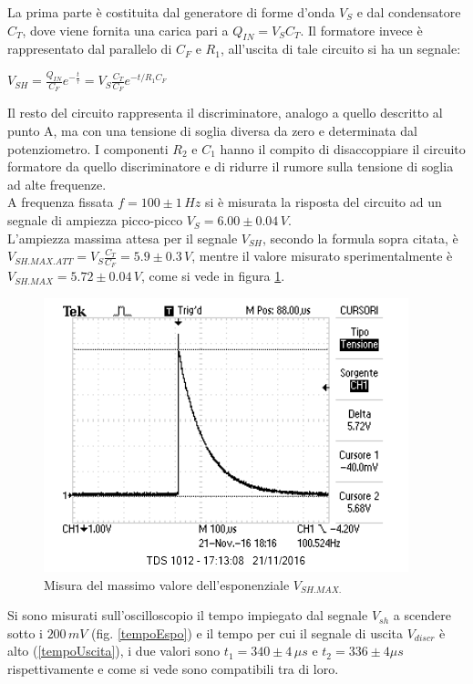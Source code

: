 \documentclass[10pt,a4paper]{article}
\begin{document}
La prima parte è costituita dal generatore di forme d'onda $V_S$ e dal condensatore $C_T$, dove viene fornita una carica pari a $Q_{IN}=V_S C_T$. Il formatore invece è rappresentato dal parallelo di $C_F$ e $R_1$, all'uscita di tale circuito si ha un segnale:\\
\begin{center}
$V_{SH}=\frac{Q_{IN}}{C_F} e^{-\frac{t}{\tau}} = V_S \frac{C_T}{C_F} e^{-t/R_1 C_F}$\\
\end{center}

Il resto del circuito rappresenta il discriminatore, analogo a quello descritto al punto A, ma con una tensione di soglia diversa da zero e determinata dal potenziometro. I componenti $R_2$ e $C_1$ hanno il compito di disaccoppiare il circuito formatore da quello discriminatore e di ridurre il rumore sulla tensione di soglia ad alte frequenze.\\
A frequenza fissata $f = 100\pm 1 \, Hz$ si è misurata la risposta del circuito ad un segnale di ampiezza picco-picco $V_S = 6.00 \pm 0.04 \, V$.\\
L'ampiezza massima attesa per il segnale $V_{SH}$, secondo la formula sopra citata, è $V_{SH.MAX.ATT} = V_S \frac{C_T}{C_F} =  5.9 \pm 0.3 \, V$, mentre il valore misurato sperimentalmente è $V_{SH.MAX} = 5.72 \pm 0.04 \, V$, come si vede in figura \ref{esponenziale}.\\

\begin{figure}[htb!]
\centering
\includegraphics[scale=1.0]{immagini/esponenziale.png}
\caption{Misura del massimo valore dell'esponenziale $V_{SH.MAX.}$}
\label{esponenziale}
\end{figure}

Si sono misurati sull'oscilloscopio il tempo impiegato dal segnale $V_{sh}$ a scendere sotto i  $200 \, mV$ (fig. \ref{tempoEspo}) e il tempo per cui il segnale di uscita $V_{discr}$ è alto (\ref{tempoUscita}), i due valori sono $t_1 = 340 \pm 4 \, \mu s$ e  $t_2 = 336 \pm 4 \mu s$ rispettivamente e come si vede sono compatibili tra di loro.
\end{document}

